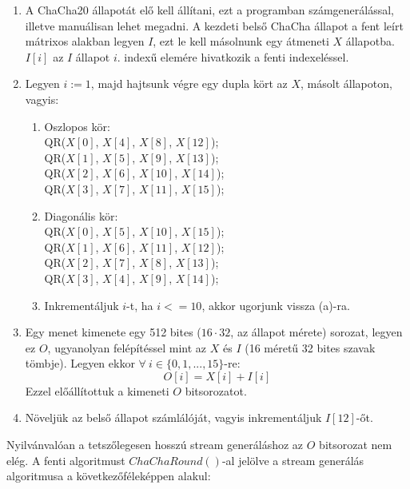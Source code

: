 \documentclass[12pt]{article}
\begin{document}
	\begin{enumerate}
		\item A ChaCha20 állapotát elő kell állítani, ezt a programban számgenerálással, illetve manuálisan lehet megadni. A kezdeti belső ChaCha állapot a fent leírt mátrixos alakban legyen $I$, ezt le kell másolnunk egy átmeneti $X$ állapotba. $I[i]$ az $I$ állapot $i$. indexű elemére hivatkozik a fenti indexeléssel.
		\item Legyen $i := 1$, majd hajtsunk végre egy dupla kört az $X$, másolt állapoton, vagyis:
		\begin{enumerate}
			\item Oszlopos kör: \\
			QR($X[0]$, $X[4]$, $X[8]$, $X[12]$); \\
			QR($X[1]$, $X[5]$, $X[9]$, $X[13]$); \\
			QR($X[2]$, $X[6]$, $X[10]$, $X[14]$); \\
			QR($X[3]$, $X[7]$, $X[11]$, $X[15]$);
			\item Diagonális kör:
			\\QR($X[0]$, $X[5]$, $X[10]$, $X[15]$); \\
			QR($X[1]$, $X[6]$, $X[11]$, $X[12]$); \\
			QR($X[2]$, $X[7]$, $X[8]$, $X[13]$); \\
			QR($X[3]$, $X[4]$, $X[9]$, $X[14]$); \\
			\item Inkrementáljuk $i$-t, ha $i <= 10$, akkor ugorjunk vissza (a)-ra.
		\end{enumerate}
		\item Egy menet kimenete egy 512 bites ($16\cdot32$, az állapot mérete) sorozat, legyen ez $O$, ugyanolyan felépítéssel mint az $X$ és $I$ (16 méretű 32 bites szavak tömbje). Legyen ekkor $\forall \ i \in \{0, 1,..., 15\}$-re:
		$$O[i] = X[i] + I[i]$$
		Ezzel előállítottuk a kimeneti $O$ bitsorozatot.
		\item Növeljük az belső állapot számlálóját, vagyis inkrementáljuk $I[12]$-őt.
	\end{enumerate}
	Nyilvánvalóan a tetszőlegesen hosszú stream generáláshoz az $O$ bitsorozat nem elég. A fenti algoritmust $ChaChaRound()$-al jelölve a stream generálás algoritmusa a következőféleképpen alakul:
\end{document}
